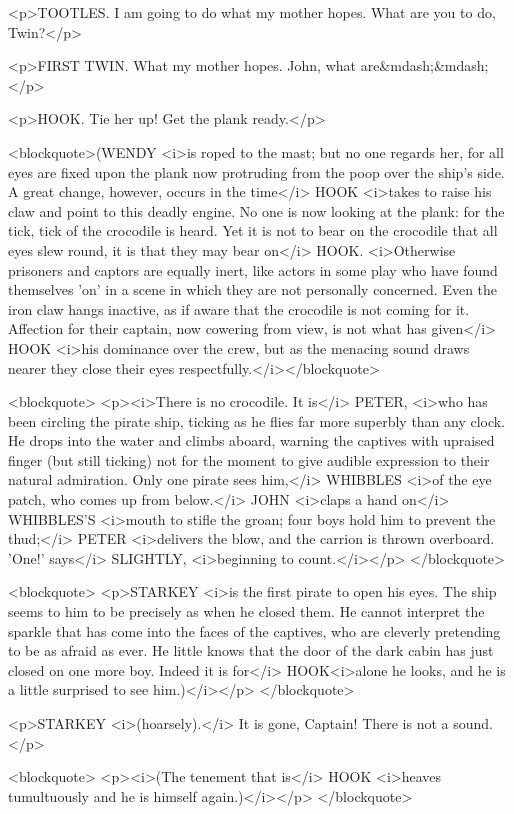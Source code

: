 <p>TOOTLES. I am going to do what my mother hopes. What are you to
do, Twin?</p>

<p>FIRST TWIN. What my mother hopes. John, what are&mdash;&mdash;</p>

<p>HOOK. Tie her up! Get the plank ready.</p>

<blockquote>(WENDY <i>is roped to the mast; but no one regards her,
for all eyes are fixed upon the plank now protruding from the poop
over the ship's side. A great change, however, occurs in the time</i>
HOOK <i>takes to raise his claw and point to this deadly engine. No
one is now looking at the plank: for the tick, tick of the crocodile
is heard. Yet it is not to bear on the crocodile that all eyes slew
round, it is that they may bear on</i> HOOK. <i>Otherwise prisoners
and captors are equally inert, like actors in some play who have
found themselves 'on' in a scene in which they are not personally
concerned. Even the iron claw hangs inactive, as if aware that the
crocodile is not coming for it. Affection for their captain, now
cowering from view, is not what has given</i> HOOK <i>his dominance
over the crew, but as the menacing sound draws nearer they close
their eyes respectfully.</i></blockquote>

<blockquote>
<p><i>There is no crocodile. It is</i> PETER, <i>who has been
circling the pirate ship, ticking as he flies far more superbly than
any clock. He drops into the water and climbs aboard, warning the
captives with upraised finger (but still ticking) not for the moment
to give audible expression to their natural admiration. Only one
pirate sees him,</i> WHIBBLES <i>of the eye patch, who comes up from
below.</i> JOHN <i>claps a hand on</i> WHIBBLES'S <i>mouth to stifle
the groan; four boys hold him to prevent the thud;</i> PETER
<i>delivers the blow, and the carrion is thrown overboard. 'One!'
says</i> SLIGHTLY, <i>beginning to count.</i></p>
</blockquote>

<blockquote>
<p>STARKEY <i>is the first pirate to open his eyes. The ship seems to
him to be precisely as when he closed them. He cannot interpret the
sparkle that has come into the faces of the captives, who are
cleverly pretending to be as afraid as ever. He little knows that the
door of the dark cabin has just closed on one more boy. Indeed it is
for</i> HOOK<i>alone he looks, and he is a little surprised to see
him.)</i></p>
</blockquote>

<p>STARKEY <i>(hoarsely).</i> It is gone, Captain! There is not a
sound.</p>

<blockquote>
<p><i>(The tenement that is</i> HOOK <i>heaves tumultuously and he is
himself again.)</i></p>
</blockquote>

